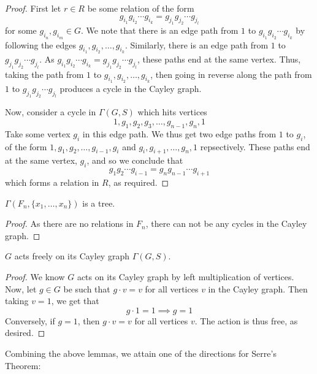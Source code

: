 \begin{proof}
    First let $r \in R$ be some relation of the form
    \[
        g_{i_1}g_{i_2}\cdots g_{i_k} = g_{j_1}g_{j_2}\cdots g_{j_l}
    \]
    for some $g_{i_n}, g_{i_m} \in G$. We note that there is an edge path from $1$ to $g_{i_1}g_{i_2}\cdots g_{i_k}$ by following the edges $g_{i_1}, g_{i_2}, \ldots, g_{i_k}$. Similarly, there is an edge path from $1$ to $g_{j_1}g_{j_2}\cdots g_{j_l}$. As $g_{i_1}g_{i_2}\cdots g_{i_k} = g_{j_1}g_{j_2}\cdots g_{j_l}$, these paths end at the same vertex. Thus, taking the path from $1$ to $g_{i_1}, g_{i_2}, \ldots, g_{i_k}$, then going in reverse along the path from $1$ to $g_{j_1}g_{j_2}\cdots g_{j_l}$ produces a cycle in the Cayley graph. 

    Now, consider a cycle in $\Gamma(G,S)$ which hits vertices
    \[
        1, g_1, g_2, g_3, \ldots, g_{n-1}, g_n, 1
    \] 
    Take some vertex $g_i$ in this edge path. We thus get two edge paths from $1$ to $g_i$, of the form $1,g_1,g_2,\ldots,g_{i-1},g_i$ and $g_i,g_{i+1}, \ldots, g_n, 1$ repsectively. These paths end at the same vertex, $g_i$, and so we conclude that 
    \[
        g_1g_2\cdots g_{i-1} = g_ng_{n-1}\cdots g_{i+1}
    \]
    which forms a relation in $R$, as required. 
\end{proof}

\begin{cor}\label{Cayley Graph of a Free Group is a Tree}
    $\Gamma(F_n, \{x_1, \ldots, x_n\})$ is a tree.
\end{cor}

\begin{proof}
    As there are no relations in $F_n$, there can not be any cycles in the Cayley graph. 
\end{proof}

\begin{lemma}\label{Action on Cayley Graph is Free}
    $G$ acts freely on its Cayley graph $\Gamma(G, S)$.
\end{lemma}

\begin{proof}
    We know $G$ acts on its Cayley graph by left multiplication of vertices. Now, let $g \in G$ be such that $g \cdot v = v$ for all vertices $v$ in the Cayley graph. Then taking $v = 1$, we get that 
    \[
        g \cdot 1 = 1 \implies g = 1
    \]
    Conversely, if $g = 1$, then $g \cdot v = v$ for all vertices $v$. The action is thus free, as desired.
\end{proof}

Combining the above lemmas, we attain one of the directions for Serre's Theorem:

